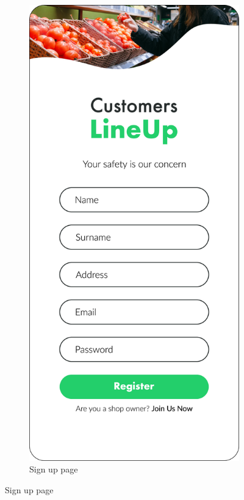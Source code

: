 \begin{figure}[H]
\begin{subfigure}[t]{0.28\textwidth}
    \end{subfigure}
    \quad
    \begin{subfigure}[t]{0.28\textwidth} 
        \includegraphics{../mockups/sign_up}
        \caption*{Sign up page}
    \end{subfigure}
\end{figure}

